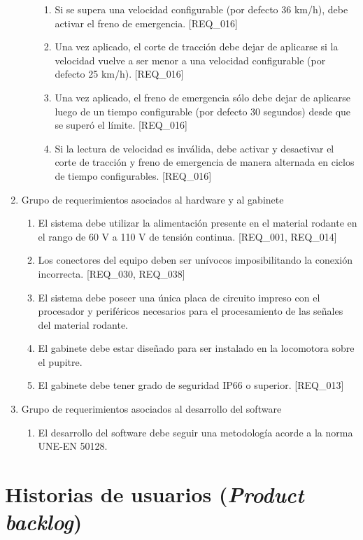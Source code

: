 \documentclass[11pt]{charter}
\begin{document}
\begin{enumerate}
\begin{enumerate}
\begin{enumerate}
    \item Si se supera una velocidad configurable (por defecto 36 km/h), debe activar el freno de emergencia. [REQ\_016]
    \item Una vez aplicado, el corte de tracción debe dejar de aplicarse si la velocidad vuelve a ser menor a una velocidad configurable (por defecto 25 km/h). [REQ\_016]
    \item Una vez aplicado, el freno de emergencia sólo debe dejar de aplicarse luego de un tiempo configurable (por defecto 30 segundos) desde que se superó el límite. [REQ\_016]
    \item Si la lectura de velocidad es inválida, debe activar y desactivar el corte de tracción y freno de emergencia de manera alternada en ciclos de tiempo configurables. [REQ\_016]
    \end{enumerate}
  \end{enumerate}
\item Grupo de requerimientos asociados al hardware y al gabinete
  \begin{enumerate}
    \item El sistema debe utilizar la alimentación presente en el material rodante en el rango de 60 V a 110 V de tensión continua. [REQ\_001, REQ\_014]
    \item Los conectores del equipo deben ser unívocos imposibilitando la conexión incorrecta. [REQ\_030, REQ\_038]
    \item El sistema debe poseer una única placa de circuito impreso con el procesador y periféricos necesarios para el procesamiento de las señales del material rodante.
    \item El gabinete debe estar diseñado para ser instalado en la locomotora sobre el pupitre.
    \item El gabinete debe tener grado de seguridad IP66 o superior. [REQ\_013]
  \end{enumerate}
\item Grupo de requerimientos asociados al desarrollo del software
  \begin{enumerate}
    \item El desarrollo del software debe seguir una metodología acorde a la norma UNE-EN 50128.
  \end{enumerate}
\end{enumerate}

\section{Historias de usuarios (\textit{Product backlog})}
\label{sec:backlog}
\end{document}
